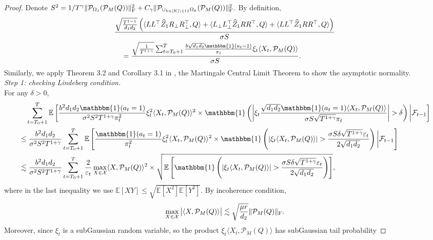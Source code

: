 \documentclass[12pt]{article}
\newcommand\fro[1]{\| #1 \|_{\rm{F}}}
\newcommand{\inp}[2]{\langle #1,#2\rangle}
\def\EE{{\mathbb E}}
\theoremstyle{plain}
\begin{document}
\begin{proof}
    Denote $S^2=1/T^{\gamma}\fro{\mathcal{P}_{\Omega_1}(\mathcal{P}_M(Q))}^2+C_{\gamma}\fro{\mathcal{P}_{\cup_{k\in [K]\backslash \{1\}} \Omega_k}(\mathcal{P}_{M}(Q))}^2$. By definition, 
    \begin{align*}
        &\frac{\sqrt{\frac{T^{1-\gamma}}{d_1d_2}}\left(\inp{LL^{\top}\widehat{Z}_1R_{\perp}R_{\perp}^{\top}}{Q} + \inp{L_{\perp}L_{\perp}^{\top}\widehat{Z}_1RR^{\top}}{Q} + \inp{LL^{\top}\widehat{Z}_1RR^{\top}}{Q} \right)}{\sigma S} \\ &\quad = \frac{\sqrt{\frac{1}{T^{1+\gamma}}} \sum_{t=T_0+1}^T \frac{b\sqrt{d_1d_2}\mathbbm{1}(a_t=1)}{\pi_t}\xi_t\inp{X_t}{\mathcal{P}_M(Q)}}{\sigma S}.
    \end{align*}
    Similarly, we apply Theorem 3.2 and Corollary 3.1 in \cite{hall2014martingale}, the Martingale Central Limit Theorem to show the asymptotic normality. \\
    \emph{Step 1: checking Lindeberg condition.} \\
    For any $\delta>0$,
    \begin{align*}
        &\quad \sum_{t=T_0+1}^T \EE\left[\frac{b^2d_1d_2\mathbbm{1}(a_t=1)}{\sigma^2S^2T^{1+\gamma}\pi_t^2}\xi_t^2\inp{X_t}{\mathcal{P}_M(Q)}^2 \times  \mathbbm{1}\left(\left|\xi_t\frac{\sqrt{d_1d_2}\mathbbm{1}(a_t=1)\inp{X_t}{\mathcal{P}_M(Q)}}{\sigma S\sqrt{T^{1+\gamma}}\pi_t}\right|>\delta \right)\bigg|\mathcal{F}_{t-1}\right] \\
        &\leq \frac{b^2d_1d_2}{\sigma^2S^2T^{1+\gamma}}\sum_{t=T_0+1}^T \EE\left[\frac{\mathbbm{1}(a_t=1)}{\pi_t^2}\xi_t^2\inp{X_t}{\mathcal{P}_M(Q)}^2 \times  \mathbbm{1}\left(\left|\xi_t\inp{X_t}{\mathcal{P}_M(Q)}\right|>\frac{\sigma S\delta\sqrt{T^{1+\gamma}}\varepsilon_t}{2\sqrt{d_1d_2}} \right)\bigg|\mathcal{F}_{t-1}\right] \\
        &\lesssim \frac{b^2d_1d_2}{\sigma^2S^2T^{1+\gamma}}  \sum_{t=T_0+1}^T \frac{2}{\varepsilon_t}\max_{X\in \mathcal{X}} \inp{X}{\mathcal{P}_M(Q)}^2 \times \sqrt{\EE\left[\mathbbm{1}\left(\left|\xi_t\inp{X_t}{\mathcal{P}_M(Q)}\right|>\frac{\sigma S\delta\sqrt{T^{1+\gamma}}\varepsilon_t}{2\sqrt{d_1d_2}} \right)\right]},
    \end{align*}
    where in the last inequality we use $\EE[XY]\leq \sqrt{\EE[X^2]\EE[Y^2]}$.
    By incoherence condition, 
    \begin{align*}       
    \max_{X\in \mathcal{X}} \big|\inp{X}{\mathcal{P}_M(Q)}\big|\lesssim \sqrt{\frac{\mu r}{d_2}}\fro{\mathcal{P}_M(Q)}.
    \end{align*}
    Moreover, since $\xi_t$ is a subGaussian random variable, so the product $\xi_t\inp{X_t}{\mathcal{P}_M(Q)}$ has subGaussian tail probability

\end{proof}
\end{document}
